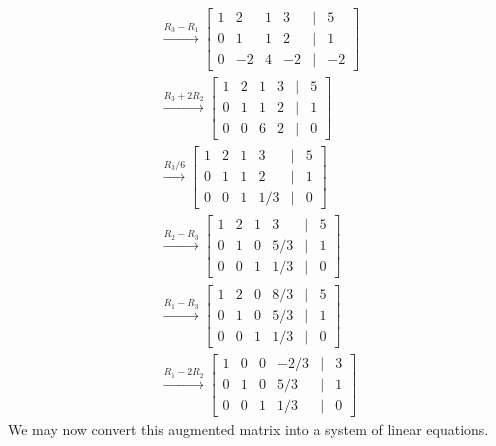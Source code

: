 \begin{example}
\begin{solution}
        \begin{gather*}\overset{R_3-R_1}{\longrightarrow} \begin{bmatrix}
            1 & 2 & 1 & 3 & \vert & 5 \\
            0 & 1 & 1 & 2 & \vert & 1 \\
            0 & -2 & 4 & -2 & \vert & -2
        \end{bmatrix}\\
        \overset{R_3+2R_2}{\longrightarrow} \begin{bmatrix}
            1 & 2 & 1 & 3 & \vert & 5 \\
            0 & 1 & 1 & 2 & \vert & 1 \\
            0 & 0 & 6 & 2 & \vert & 0
        \end{bmatrix}\\
        \overset{R_3/6}{\longrightarrow} \begin{bmatrix}
            1 & 2 & 1 & 3 & \vert & 5 \\
            0 & 1 & 1 & 2 & \vert & 1 \\
            0 & 0 & 1 & 1/3 & \vert & 0
        \end{bmatrix}\\
        \overset{R_2-R_3}{\longrightarrow} \begin{bmatrix}
            1 & 2 & 1 & 3 & \vert & 5 \\
            0 & 1 & 0 & 5/3 & \vert & 1 \\
            0 & 0 & 1 & 1/3 & \vert & 0
        \end{bmatrix}\\
        \overset{R_1-R_3}{\longrightarrow} \begin{bmatrix}
            1 & 2 & 0 & 8/3 & \vert & 5 \\
            0 & 1 & 0 & 5/3 & \vert & 1 \\
            0 & 0 & 1 & 1/3 & \vert & 0
        \end{bmatrix}\\
        \overset{R_1-2R_2}{\longrightarrow} \begin{bmatrix}
            1 & 0 & 0 & -2/3 & \vert & 3 \\
            0 & 1 & 0 & 5/3 & \vert & 1 \\
            0 & 0 & 1 & 1/3 & \vert & 0
        \end{bmatrix}
        \end{gather*}
        We may now convert this augmented matrix into a system of linear equations.


\end{solution}
\end{example}
